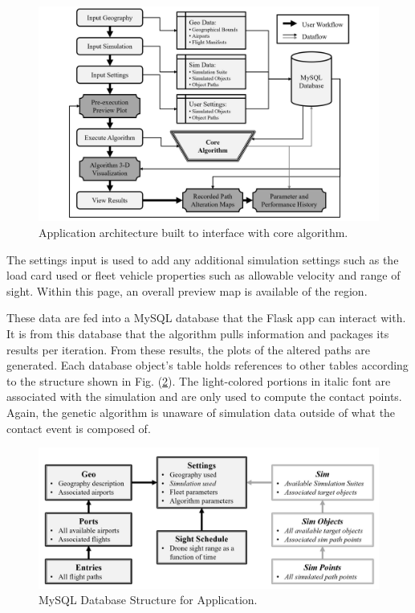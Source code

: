 \documentclass[conf]{new-aiaa}
\begin{document}
\begin{figure}[hbt!]
\centering
\includegraphics[width=1\textwidth]{figs/app-architecture}
\caption{Application architecture built to interface with core algorithm.}
\label{app-architecture}
\end{figure}

The settings input is used to add any additional simulation settings such as the load card used or fleet vehicle properties such as allowable velocity and range of sight. Within this page, an overall preview map is available of the region.

These data are fed into a MySQL database that the Flask app can interact with. It is from this database that the algorithm pulls information and packages its results per iteration. From these results, the plots of the altered paths are generated. Each database object's table holds references to other tables according to the structure shown in Fig. (\ref{db-structure}). The light-colored portions in italic font are associated with the simulation and are only used to compute the contact points. Again, the genetic algorithm is unaware of simulation data outside of what the contact event is composed of.

\begin{figure}[hbt!]
\centering
\includegraphics[width=1\textwidth]{figs/db-structure}
\caption{MySQL Database Structure for Application.}
\label{db-structure}
\end{figure}
\end{document}
